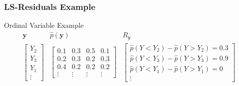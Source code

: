\documentclass{beamer}
\begin{document}
\begin{frame}
	\frametitle{LS-Residuals Example}
	\begin{block}{Ordinal Variable Example}
	\[
		\begin{array}{ccc}
			\bm{y} & \hat{p}(\bm{y}) & R_{\bm{y}} \\

			\begin{bmatrix}
				Y_2 \\
				Y_3 \\
				Y_1 \\
				\vdots
			\end{bmatrix} &
			\begin{bmatrix}
				0.1 & 0.3 & 0.5 & 0.1 \\
				0.2 & 0.3 & 0.2 & 0.3 \\
				0.4 & 0.2 & 0.2 & 0.2 \\
				\vdots & \vdots & \vdots & \vdots
			\end{bmatrix} &
			\begin{bmatrix}
				\hat{p}(Y < Y_2) - \hat{p}(Y>Y_2) = 0.3 \\
				\hat{p}(Y < Y_3) - \hat{p}(Y>Y_3) = 0.9 \\
				\hat{p}(Y < Y_1) - \hat{p}(Y>Y_1) = 0 \\
				\vdots
			\end{bmatrix} \\
		\end{array}
	\]
	\end{block}


\end{frame}
\end{document}
